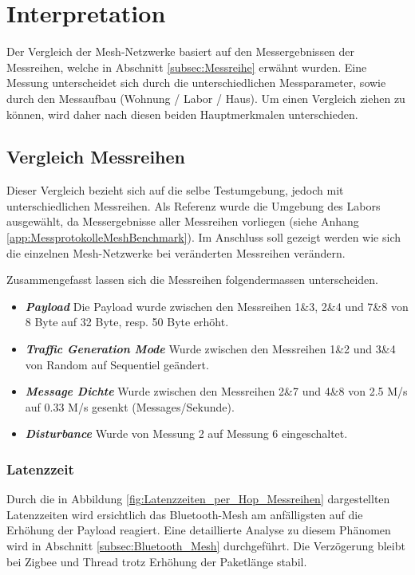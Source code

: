 \section{Interpretation}
Der Vergleich der Mesh-Netzwerke basiert auf den Messergebnissen der Messreihen, welche in Abschnitt \ref{subsec:Messreihe} erwähnt wurden. Eine Messung unterscheidet sich durch die unterschiedlichen Messparameter, sowie durch den Messaufbau (Wohnung / Labor / Haus). Um einen Vergleich ziehen zu können, wird daher nach diesen beiden Hauptmerkmalen unterschieden.

\subsection{Vergleich Messreihen}\label{subsec:VergleichMessreihen}
Dieser Vergleich bezieht sich auf die selbe Testumgebung, jedoch mit unterschiedlichen Messreihen. Als Referenz wurde die Umgebung des Labors ausgewählt, da Messergebnisse aller Messreihen vorliegen (siehe Anhang \ref{app:MessprotokolleMeshBenchmark}). Im Anschluss soll gezeigt werden wie sich die einzelnen Mesh-Netzwerke bei veränderten Messreihen verändern.

Zusammengefasst lassen sich die Messreihen folgendermassen unterscheiden. 

\begin{itemize}
	\item \textbf{\textit{Payload}} Die Payload wurde zwischen den Messreihen 1\&3, 2\&4 und 7\&8 von 8 Byte auf 32 Byte, resp. 50 Byte erhöht.
	\item \textbf{\textit{Traffic Generation Mode}} Wurde zwischen den Messreihen 1\&2 und 3\&4 von Random auf Sequentiel geändert.
	\item \textbf{\textit{Message Dichte}} Wurde zwischen den Messreihen 2\&7 und 4\&8 von 2.5 M/s auf 0.33 M/s gesenkt (Messages/Sekunde).
	\item \textbf{\textit{Disturbance}} Wurde von Messung 2 auf Messung 6 eingeschaltet.
\end{itemize}

\subsubsection{Latenzzeit}\label{subsec:VergleichLatenzzeitMessreihen}
Durch die in Abbildung \ref{fig:Latenzzeiten_per_Hop_Messreihen} dargestellten Latenzzeiten wird ersichtlich das Bluetooth-Mesh am anfälligsten auf die Erhöhung der Payload reagiert. Eine detaillierte Analyse zu diesem Phänomen wird in Abschnitt \ref{subsec:Bluetooth_Mesh} durchgeführt. Die Verzögerung bleibt bei Zigbee und Thread trotz Erhöhung der Paketlänge stabil.

